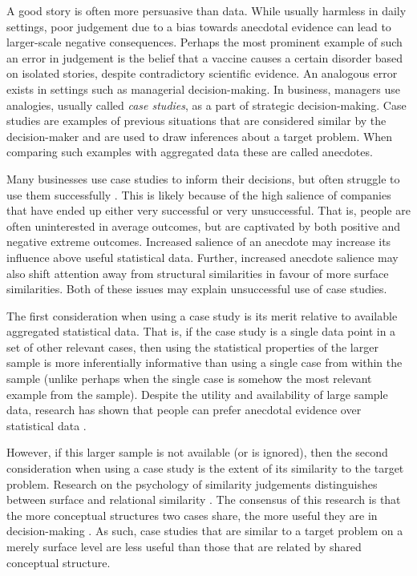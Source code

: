 \documentclass[a4paper, nobind, dvipsnames]{templates/ociamthesis}
\theoremstyle{definition}
\theoremstyle{definition}
\theoremstyle{definition}
\theoremstyle{definition}
\theoremstyle{remark}
\begin{document}
A good story is often more persuasive than data. While usually harmless in daily
settings, poor judgement due to a bias towards anecdotal evidence can lead to
larger-scale negative consequences. Perhaps the most prominent example of such
an error in judgement is the belief that a vaccine causes a certain disorder
based on isolated stories, despite contradictory scientific evidence. An
analogous error exists in settings such as managerial decision-making. In
business, managers use analogies, usually called \emph{case studies}, as a part of
strategic decision-making. Case studies are examples of previous situations that
are considered similar by the decision-maker and are used to draw inferences
about a target problem. When comparing such examples with aggregated data these
are called anecdotes.

Many businesses use case studies to inform their decisions, but often struggle
to use them successfully \autocite{gavetti2005a}. This is likely because of the high
salience of companies that have ended up either very successful or very
unsuccessful. That is, people are often uninterested in average outcomes, but
are captivated by both positive and negative extreme outcomes. Increased
salience of an anecdote may increase its influence above useful statistical
data. Further, increased anecdote salience may also shift attention away from
structural similarities in favour of more surface similarities. Both of these
issues may explain unsuccessful use of case studies.

The first consideration when using a case study is its merit relative to
available aggregated statistical data. That is, if the case study is a single
data point in a set of other relevant cases, then using the statistical
properties of the larger sample is more inferentially informative than using a
single case from within the sample (unlike perhaps when the single case is
somehow the most relevant example from the sample). Despite the utility and
availability of large sample data, research has shown that people can prefer
anecdotal evidence over statistical data \autocites[e.g.,][]{reinard1988,shen2015,jaramillo2019,freling2020}.

However, if this larger sample is not available (or is ignored), then the second
consideration when using a case study is the extent of its similarity to the
target problem. Research on the psychology of similarity judgements
distinguishes between surface and relational similarity \autocite{gentner1983}. The
consensus of this research is that the more conceptual structures two cases
share, the more useful they are in decision-making \autocite{markman1995,lassaline1996}. As such, case studies that are similar to a target problem on a
merely surface level are less useful than those that are related by shared
conceptual structure.
\end{document}
